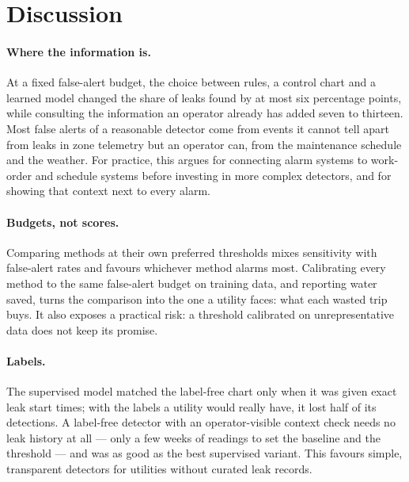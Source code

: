 \documentclass[11pt,a4paper]{article}
\begin{document}
\section{Discussion}

\paragraph{Where the information is.} At a fixed false-alert budget, the choice between rules, a control chart and a learned model changed the share of leaks found by at most six percentage points, while consulting the information an operator already has added seven to thirteen. Most false alerts of a reasonable detector come from events it cannot tell apart from leaks in zone telemetry but an operator can, from the maintenance schedule and the weather. For practice, this argues for connecting alarm systems to work-order and schedule systems before investing in more complex detectors, and for showing that context next to every alarm.

\paragraph{Budgets, not scores.} Comparing methods at their own preferred thresholds mixes sensitivity with false-alert rates and favours whichever method alarms most. Calibrating every method to the same false-alert budget on training data, and reporting water saved, turns the comparison into the one a utility faces: what each wasted trip buys. It also exposes a practical risk: a threshold calibrated on unrepresentative data does not keep its promise.

\paragraph{Labels.} The supervised model matched the label-free chart only when it was given exact leak start times; with the labels a utility would really have, it lost half of its detections. A label-free detector with an operator-visible context check needs no leak history at all --- only a few weeks of readings to set the baseline and the threshold --- and was as good as the best supervised variant. This favours simple, transparent detectors for utilities without curated leak records.
\end{document}
